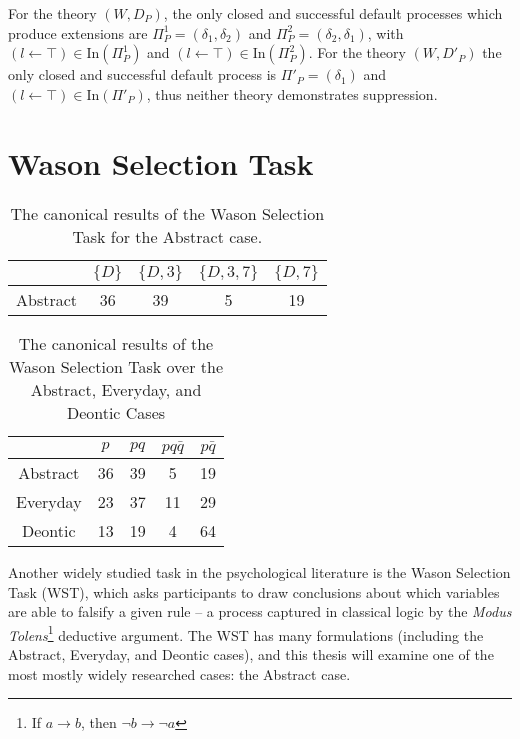 For the theory $(W,D_P)$, the only closed and successful default processes which produce extensions are $\Pi_P^1=(\delta_1,\delta_2)$ and $\Pi^2_P=(\delta_2,\delta_1)$, with $(l\leftarrow \top)\in \text{In}(\Pi^1_P)$ and $(l\leftarrow \top)\in \text{In}(\Pi^2_P)$. For the theory $(W,D'_P)$ the only closed and successful default process is $\Pi'_P=(\delta_1)$ and ${(l\leftarrow \top)\in \text{In}(\Pi'_P)}$, thus neither theory demonstrates suppression.

\section{Wason Selection Task}\label{ssec:wst}
\begin{table}
\begin{center}


\begin{tabular}{ c c c c c}
  & \textbf{$\{D\}$} & \textbf{$\{D,3\}$} & \textbf{$\{D,3,7\}$} & \textbf{$\{D,7\}$}\\ 
  \hline
 Abstract & 36 & 39 & 5 & 19\\  
\end{tabular}
\caption{The canonical results of the Wason Selection Task for the Abstract case.}
\label{tbl:can}
\end{center}
\end{table}

\begin{table}
\begin{center}
\begin{tabular}{ c c c c c}
  & \textbf{$p$} & \textbf{$pq$} & \textbf{$pq\bar{q}$} & \textbf{$p\bar{q}$}\\ 
  \hline
 Abstract & 36 & 39 & 5 & 19\\  
 Everyday & 23 & 37 & 11 & 29\\  
 Deontic & 13 & 19 & 4 & 64
\end{tabular}
\caption{The canonical results of the Wason Selection Task over the Abstract, Everyday, and Deontic Cases}
\label{tbl:can_full}
\end{center}
\end{table}

Another widely studied task in the psychological literature is the Wason Selection Task (WST), which asks participants to draw conclusions about which variables are able to falsify a given rule -- a process captured in classical logic by the \textit{Modus Tolens}\footnote{If $a\rightarrow b$, then $\lnot b \rightarrow \lnot a$} deductive argument. The WST has many formulations (including the Abstract, Everyday, and Deontic cases), and this thesis will examine one of the most mostly widely researched cases: the Abstract case. 

